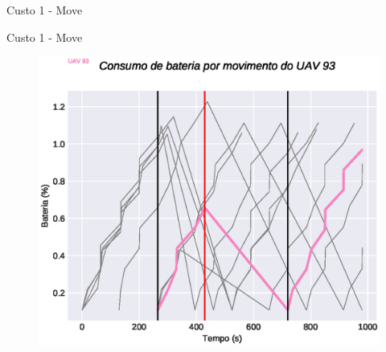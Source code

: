 \begin{frame}{Custo 1 - Move}
\begin{figure}[!htb]
                 \end{figure}
            \end{frame}\begin{frame}{Custo 1 - Move}
                \begin{figure}[!htb]
                     \includegraphics[width=\textwidth]{custo_1/uav_move_acum_uav_7.eps}
                 \end{figure}
            \end{frame}